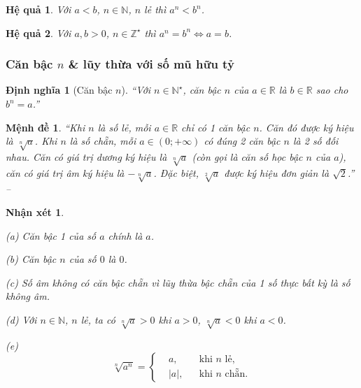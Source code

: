 \documentclass{article}
\numberwithin{equation}{section}
\newtheorem{nhanxet}{Nhận xét}[section]
\newtheorem{hequa}{Hệ quả}[section]
\newtheorem{dinhnghia}{Định nghĩa}[section]
\newtheorem{menhde}{Mệnh đề}[section]
\begin{document}
\begin{hequa}
	Với $a < b$, $n\in\mathbb{N}$, $n$ lẻ thì $a^n < b^n$.
\end{hequa}

\begin{hequa}
	Với $a,b > 0$, $n\in\mathbb{Z}^\star$ thì $a^n = b^n\Leftrightarrow a = b$.
\end{hequa}

\subsubsection{Căn bậc $n$ \& lũy thừa với số mũ hữu tỷ}

\begin{dinhnghia}[Căn bậc $n$]
	``Với $n\in\mathbb{N}^\star$, \emph{căn bậc $n$} của $a\in\mathbb{R}$ là $b\in\mathbb{R}$ sao cho $b^n = a$.''
\end{dinhnghia}

\begin{menhde}
	``Khi $n$ là số lẻ, mỗi $a\in\mathbb{R}$ chỉ có 1 căn bậc $n$. Căn đó được ký hiệu là $\sqrt[n]{a}$. Khi $n$ là số chẵn, mỗi $a\in(0;+\infty)$ có đúng 2 căn bậc $n$ là 2 số đối nhau. Căn có giá trị dương ký hiệu là $\sqrt[n]{a}$ (còn gọi là \emph{căn số học bậc $n$} của $a$), căn có giá trị âm ký hiệu là $-\sqrt[n]{a}$. Đặc biệt, $\sqrt[2]{a}$ được ký hiệu đơn giản là $\sqrt{2}$.'' -- \cite[p. 72]{SGK_Toan_12_giai_tich_nang_cao}
\end{menhde}

\begin{nhanxet}
	\begin{enumerate*}
		\item[(a)] Căn bậc 1 của số $a$ chính là $a$.
		\item[(b)] Căn bậc $n$ của số $0$ là $0$.
		\item[(c)] Số âm không có căn bậc chẵn vì lũy thừa bậc chẵn của 1 số thực bất kỳ là số không âm.
		\item[(d)] Với $n\in\mathbb{N}$, $n$ lẻ, ta có $\sqrt[n]{a} > 0$ khi $a > 0$, $\sqrt[n]{a} < 0$ khi $a < 0$.
	\end{enumerate*}
	(e)
	\begin{equation*}
		\sqrt[n]{a^n} = \left\{\begin{split}
			&a,&&\mbox{khi } n\mbox{ lẻ},\\
			&|a|,&&\mbox{khi } n\mbox{ chẵn}.
		\end{split}\right.
	\end{equation*}
\end{nhanxet}
\end{document}
